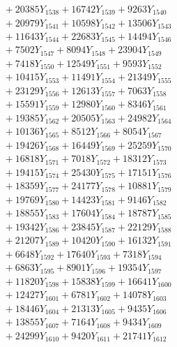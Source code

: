 \documentclass[a4paper,10pt]{article}
\begin{document}
{\begin{align}
&\;  + 20385 Y_{1538} + 16742 Y_{1539} + 9263 Y_{1540} \\[0.3ex]
&\;  + 20979 Y_{1541} + 10598 Y_{1542} + 13506 Y_{1543} \\[0.3ex]
&\;  + 11643 Y_{1544} + 22683 Y_{1545} + 14494 Y_{1546} \\[0.3ex]
&\;  + 7502 Y_{1547} + 8094 Y_{1548} + 23904 Y_{1549} \\[0.3ex]
&\;  + 7418 Y_{1550} + 12549 Y_{1551} + 9593 Y_{1552} \\[0.3ex]
&\;  + 10415 Y_{1553} + 11491 Y_{1554} + 21349 Y_{1555} \\[0.3ex]
&\;  + 23129 Y_{1556} + 12613 Y_{1557} + 7063 Y_{1558} \\[0.5ex]\allowbreak
&\;  + 15591 Y_{1559} + 12980 Y_{1560} + 8346 Y_{1561} \\[0.3ex]
&\;  + 19385 Y_{1562} + 20505 Y_{1563} + 24982 Y_{1564} \\[0.3ex]
&\;  + 10136 Y_{1565} + 8512 Y_{1566} + 8054 Y_{1567} \\[0.3ex]
&\;  + 19426 Y_{1568} + 16449 Y_{1569} + 25259 Y_{1570} \\[0.3ex]
&\;  + 16818 Y_{1571} + 7018 Y_{1572} + 18312 Y_{1573} \\[0.3ex]
&\;  + 19415 Y_{1574} + 25430 Y_{1575} + 17151 Y_{1576} \\[0.3ex]
&\;  + 18359 Y_{1577} + 24177 Y_{1578} + 10881 Y_{1579} \\[0.3ex]
&\;  + 19769 Y_{1580} + 14423 Y_{1581} + 9146 Y_{1582} \\[0.3ex]
&\;  + 18855 Y_{1583} + 17604 Y_{1584} + 18787 Y_{1585} \\[0.3ex]
&\;  + 19342 Y_{1586} + 23845 Y_{1587} + 22129 Y_{1588} \\[0.5ex]\allowbreak
&\;  + 21207 Y_{1589} + 10420 Y_{1590} + 16132 Y_{1591} \\[0.3ex]
&\;  + 6648 Y_{1592} + 17640 Y_{1593} + 7318 Y_{1594} \\[0.3ex]
&\;  + 6863 Y_{1595} + 8901 Y_{1596} + 19354 Y_{1597} \\[0.3ex]
&\;  + 11820 Y_{1598} + 15838 Y_{1599} + 16641 Y_{1600} \\[0.3ex]
&\;  + 12427 Y_{1601} + 6781 Y_{1602} + 14078 Y_{1603} \\[0.3ex]
&\;  + 18446 Y_{1604} + 21313 Y_{1605} + 9435 Y_{1606} \\[0.3ex]
&\;  + 13855 Y_{1607} + 7164 Y_{1608} + 9434 Y_{1609} \\[0.3ex]
&\;  + 24299 Y_{1610} + 9420 Y_{1611} + 21741 Y_{1612} \\[0.3ex]

\end{align}}
\end{document}
